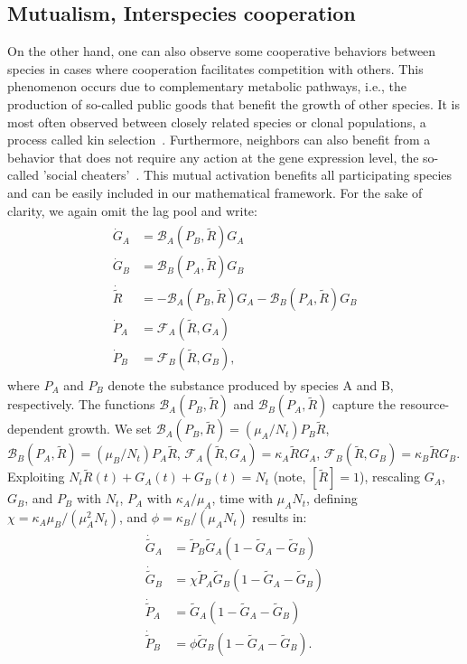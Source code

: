 \documentclass[10pt,1p,authoryear]{elsarticle}
\numberwithin{equation}{section}
\begin{document}
\subsection{Mutualism, Interspecies cooperation}
On the other hand, one can also observe some cooperative behaviors between species in cases where cooperation facilitates competition with others.
This phenomenon occurs due to complementary metabolic pathways, i.e., the production of so-called public goods that benefit the growth of other species. It is most often observed between closely related species or clonal populations, a process called kin selection~\citep{west_social_2007}.
Furthermore, neighbors can also benefit from a behavior that does not require any action at the gene expression level, the so-called 'social cheaters'~\citep{rainey_evolution_2003}.
This mutual activation benefits all participating species and can be easily included in our mathematical framework.
For the sake of clarity, we again omit the lag pool and write:
\begin{align}
	\begin{split}
    \dot{G}_A &= \mathcal{B}_A(P_B,\tilde{R})G_A\\
    \dot{G}_B &= \mathcal{B}_B(P_A,\tilde{R})G_B\\
    \dot{\tilde{R}} &=-\mathcal{B}_A(P_B,\tilde{R})G_A-\mathcal{B}_B(P_A,\tilde{R})G_B\\
    \dot{P}_A &= \mathcal{F}_A(\tilde{R},G_A)\\
    \dot{P}_B &= \mathcal{F}_B(\tilde{R},G_B),
    \end{split}
\end{align}
where $P_A$ and $P_B$ denote the substance produced by species A and B, respectively.
The functions $\mathcal{B}_A(P_B,\tilde{R})$ and $\mathcal{B}_B(P_A,\tilde{R})$ capture the resource-dependent growth.
We set $\mathcal{B}_A(P_B,\tilde{R})=(\mu_A/N_t) P_B\tilde{R}$, $\mathcal{B}_B(P_A,\tilde{R})=(\mu_B/N_t) P_A \tilde{R}$, $\mathcal{F}_A(\tilde{R},G_A)=\kappa_A \tilde{R}G_A$, $\mathcal{F}_B(\tilde{R},G_B)=\kappa_B \tilde{R}G_B$.\\
%
Exploiting $N_t \tilde{R}(t)+G_A(t)+G_B(t)=N_t$ (note, $[\tilde{R}]=1$), rescaling $G_A$, $G_B$, and $P_B$ with $N_t$, $P_A$ with $\kappa_A/\mu_A$, time with $\mu_A N_t$, defining $\chi=\kappa_A\mu_B/(\mu_A^2N_t)$, and $\phi=\kappa_B/(\mu_A N_t)$ results in:
\begin{align}
    \begin{split}
        \dot{\tilde{G}}_A &= \tilde{P}_B \tilde{G}_A\left(1 - \tilde{G}_A-\tilde{G}_B\right)\\
        \dot{\tilde{G}}_B &= \chi \tilde{P}_A \tilde{G}_B\left(1 - \tilde{G}_A-\tilde{G}_B\right)\\
        \dot{\tilde{P}}_A &= \tilde{G}_A\left(1 - \tilde{G}_A-\tilde{G}_B\right)\\
        \dot{\tilde{P}}_B &=\phi \tilde{G}_B\left(1 - \tilde{G}_A-\tilde{G}_B\right).
    \end{split}
    \label{eq:1pool_2sp_cooper}
\end{align}
\end{document}
